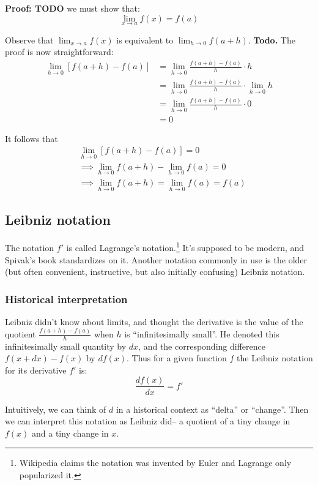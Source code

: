 \textbf{Proof: TODO} we must show that:
\[\lim_{x\to a}f(x)=f(a)\]

Observe that $\lim_{x\to a}f(x)$ is equivalent to $\lim_{h\to 0}f(a+h)$.
\textbf{Todo.} The proof is now straightforward:
\begin{align*}
  \lim_{h\to0}[f(a+h)-f(a)]&=\lim_{h\to0}\frac{f(a+h)-f(a)}{h}\cdot h\\
                         &=\lim_{h\to0}\frac{f(a+h)-f(a)}{h}\cdot \lim_{h\to
                           0}h\\
                         &=\lim_{h\to0}\frac{f(a+h)-f(a)}{h}\cdot 0\\
                         &=0
\end{align*}

It follows that
\begin{align*}
  &\lim_{h\to0}[f(a+h)-f(a)]=0\\
  &\implies \lim_{h\to0}f(a+h)-\lim_{h\to0}f(a)=0\\
  &\implies \lim_{h\to0}f(a+h)=\lim_{h\to0}f(a)=f(a)
\end{align*}

\subsection{Leibniz notation}

The notation $f'$ is called Lagrange's notation.\footnote{Wikipedia
  claims the notation was invented by Euler and Lagrange only
  popularized it.} It's supposed to be modern, and Spivak's book
standardizes on it. Another notation commonly in use is the older (but
often convenient, instructive, but also initially confusing) Leibniz
notation.

\subsubsection*{Historical interpretation}

Leibniz didn't know about limits, and thought the derivative is the
value of the quotient $\frac{f(a+h)-f(a)}{h}$ when $h$ is
``infinitesimally small''. He denoted this infinitesimally small
quantity by $dx$, and the corresponding difference $f(x+dx)-f(x)$ by
$df(x)$. Thus for a given function $f$ the Leibniz notation for its
derivative $f'$ is:
\[\frac{df(x)}{dx}=f'\]

Intuitively, we can think of $d$ in a historical context as ``delta''
or ``change''. Then we can interpret this notation as Leibniz did-- a
quotient of a tiny change in $f(x)$ and a tiny change in $x$.

